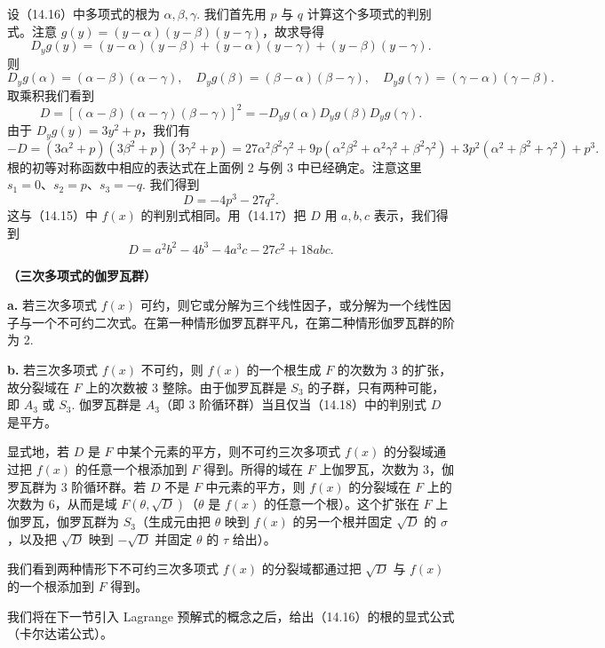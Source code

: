 设（14.16）中多项式的根为 \(\alpha, \beta, \gamma\). 我们首先用 \(p\) 与 \(q\) 计算这个多项式的判别式。注意 \(g(y) = (y-\alpha)(y-\beta)(y-\gamma)\)，故求导得
\[
D_yg(y) = (y-\alpha)(y-\beta)+(y-\alpha)(y-\gamma)+(y-\beta)(y-\gamma).
\]
则
\[
D_yg(\alpha) = (\alpha-\beta)(\alpha-\gamma), \quad D_yg(\beta) = (\beta-\alpha)(\beta-\gamma), \quad D_yg(\gamma) = (\gamma-\alpha)(\gamma-\beta).
\]
取乘积我们看到
\[
D = [(\alpha-\beta)(\alpha-\gamma)(\beta-\gamma)]^2 = -D_yg(\alpha)D_yg(\beta)D_yg(\gamma).
\]
由于 \(D_yg(y) = 3y^2+p\)，我们有
\[
-D = (3\alpha^2+p)(3\beta^2+p)(3\gamma^2+p) = 27\alpha^2\beta^2\gamma^2+9p(\alpha^2\beta^2+\alpha^2\gamma^2+\beta^2\gamma^2)+3p^2(\alpha^2+\beta^2+\gamma^2)+p^3.
\]
根的初等对称函数中相应的表达式在上面例 2 与例 3 中已经确定。注意这里 \(s_1 = 0\)、\(s_2 = p\)、\(s_3 = -q\). 我们得到
\begin{equation}
D = -4p^3-27q^2. \tag{14.18}
\end{equation}
这与（14.15）中 \(f(x)\) 的判别式相同。用（14.17）把 \(D\) 用 \(a, b, c\) 表示，我们得到
\begin{equation}
D = a^2b^2-4b^3-4a^3c-27c^2+18abc. \tag{14.18′}
\end{equation}

\noindent\textbf{（三次多项式的伽罗瓦群）}

\textbf{a.} 若三次多项式 \(f(x)\) 可约，则它或分解为三个线性因子，或分解为一个线性因子与一个不可约二次式。在第一种情形伽罗瓦群平凡，在第二种情形伽罗瓦群的阶为 2.

\textbf{b.} 若三次多项式 \(f(x)\) 不可约，则 \(f(x)\) 的一个根生成 \(F\) 的次数为 3 的扩张，故分裂域在 \(F\) 上的次数被 3 整除。由于伽罗瓦群是 \(S_3\) 的子群，只有两种可能，即 \(A_3\) 或 \(S_3\). 伽罗瓦群是 \(A_3\)（即 3 阶循环群）当且仅当（14.18）中的判别式 \(D\) 是平方。

显式地，若 \(D\) 是 \(F\) 中某个元素的平方，则不可约三次多项式 \(f(x)\) 的分裂域通过把 \(f(x)\) 的任意一个根添加到 \(F\) 得到。所得的域在 \(F\) 上伽罗瓦，次数为 3，伽罗瓦群为 3 阶循环群。若 \(D\) 不是 \(F\) 中元素的平方，则 \(f(x)\) 的分裂域在 \(F\) 上的次数为 6，从而是域 \(F(\theta, \sqrt{D})\)（\(\theta\) 是 \(f(x)\) 的任意一个根）。这个扩张在 \(F\) 上伽罗瓦，伽罗瓦群为 \(S_3\)（生成元由把 \(\theta\) 映到 \(f(x)\) 的另一个根并固定 \(\sqrt{D}\) 的 \(\sigma\)，以及把 \(\sqrt{D}\) 映到 \(-\sqrt{D}\) 并固定 \(\theta\) 的 \(\tau\) 给出）。

我们看到两种情形下不可约三次多项式 \(f(x)\) 的分裂域都通过把 \(\sqrt{D}\) 与 \(f(x)\) 的一个根添加到 \(F\) 得到。

我们将在下一节引入 Lagrange 预解式的概念之后，给出（14.16）的根的显式公式（卡尔达诺公式）。

